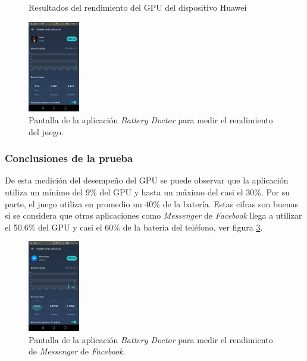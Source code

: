 \begin{figure}
   
  \caption{Resultados del rendimiento del GPU del dispositivo Huawei}
  \label{fig:GPUHuawei}
\end{figure}
                \begin{figure}[h]
                        \centering
                        \includegraphics[width=0.2\textwidth]{04ResultadosObetnidos/imagenes/baterry02.png}
                        \caption{Pantalla de la aplicación \textit{Battery Doctor} para medir el
                        rendimiento del juego.}
                        \label{fig:BateriaYolotl}
                \end{figure}
\subsubsection{Conclusiones de la prueba}
De esta medición del desempeño del GPU se puede observar que la aplicación
utiliza un mínimo del 9\% del GPU y hasta un máximo del casi el 30\%. Por su
parte, el juego utiliza en promedio un 40\% de la batería. Estas cifras son
buenas si se considera que otras aplicaciones como \textit{Messenger} de
\textit{Facebook} llega a utilizar el 50.6\% del GPU y casi el 60\% de la batería
del teléfono, ver figura \ref{fig:BateriaFacebook}.
\begin{figure}[h]
                        \centering
                        \includegraphics[width=0.2\textwidth]{04ResultadosObetnidos/imagenes/baterry01.png}
                        \caption{Pantalla de la aplicación \textit{Battery Doctor} para medir el
                        rendimiento de \textit{Messenger} de \textit{Facebook}.}
                        \label{fig:BateriaFacebook}
                \end{figure}
